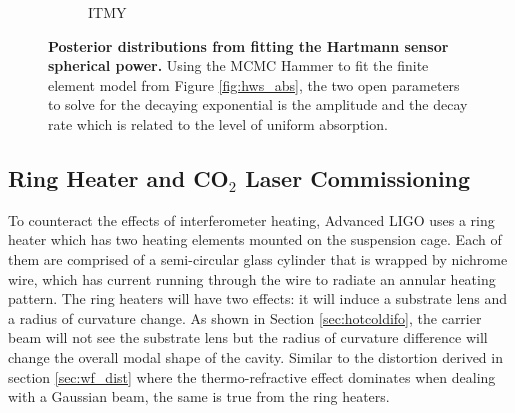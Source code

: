 \begin{figure}[!]
\begin{subfigure}[b]{0.5\textwidth}
			\caption{ITMY}
			\label{fig:mcmc_itmy_abs}
		\end{subfigure}
		\caption[Posterior distributions from fitting the Hartmann sensor spherical power.]  
		{\textbf{Posterior distributions from fitting the Hartmann sensor spherical power.}  
			Using the MCMC Hammer \cite{MCMC_Hammer} to fit the finite element model from Figure \ref{fig:hws_abs}, the two open parameters to solve for the decaying exponential is the amplitude and the decay rate which is related to the level of uniform absorption.}
		\label{fig:mcmc_hws_abs}
	\end{figure}
	
	\subsection{Ring Heater and CO$_2$ Laser Commissioning}\label{Sec:RH}
	To counteract the effects of interferometer heating, Advanced LIGO uses a ring heater \cite{ramette_analytical} \cite{wang_thermalmodel} which has two heating elements mounted on the suspension cage. Each of them are comprised of a semi-circular glass cylinder that is wrapped by nichrome wire, which has current running through the wire to radiate an annular heating pattern. The ring heaters will have two effects: it will induce a substrate lens and a radius of curvature change.  As shown in Section \ref{sec:hotcoldifo}, the carrier beam will not see the substrate lens but the radius of curvature difference will change the overall modal shape of the cavity.  Similar to the distortion derived in section \ref{sec:wf_dist} where the thermo-refractive effect dominates when dealing with a Gaussian beam, the same is true from the ring heaters.

